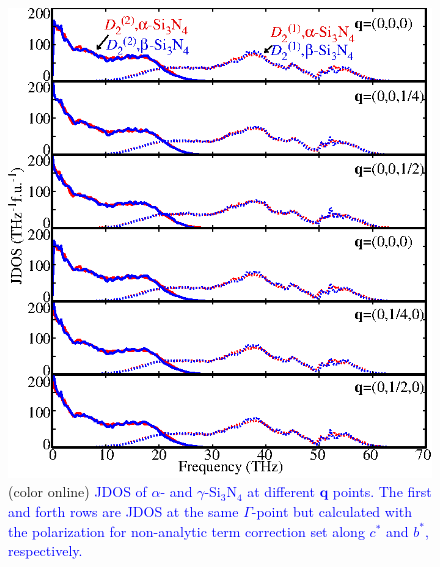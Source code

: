 \documentclass[twocolumn,amsmath,amssymb,a4paper,prb,superscriptaddress,floatfix]{revtex4-1}
\begin{document}
\begin{figure}[ht]
 \centering
  \includegraphics[width=0.9\linewidth]{figure_jdoss.eps} \caption{(color
	  online) \textcolor{blue}{JDOS of $\alpha$- and $\gamma$-Si$_3$N$_4$ at different $\mathbf q$ points.
  The first and forth rows are JDOS at the same $\Gamma$-point but calculated with the polarization for non-analytic term correction set along $c^*$ and $b^*$, respectively.} \label{fig:Fig6_338} }
 \centering
\end{figure}
\end{document}
